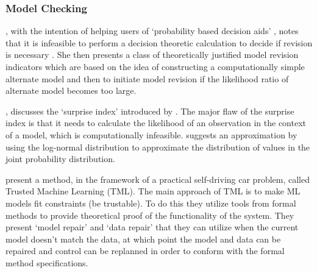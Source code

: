 \subsubsection{Model Checking}
    \citet{Laskey1991-mf}, with the intention of helping users of `probability based decision aids' , notes that it is infeasible to perform a decision theoretic calculation to decide if revision is necessary . She then presents a class of theoretically justified model revision indicators which are based on the idea of constructing a computationally simple alternate model and then to initiate model revision if the likelihood ratio of alternate model becomes too large. 

    \citet{Zagorecki2015-qy}, discusses the `surprise index' introduced by \citet{Habbema1976-xd}. 
    The major flaw of the surprise index is that it needs to calculate the likelihood of an observation in the context of a model, which is computationally infeasible. \citeauthor{Zagorecki2015-qy} suggests an approximation by using the log-normal distribution to approximate the distribution of values in the joint probability distribution. 

    \citet{Ghosh2016-dl} present a method, in the framework of a practical self-driving car problem, called Trusted Machine Learning (TML). The main approach of TML is to make ML models fit constraints (be trustable). 
    To do this they utilize tools from formal methods to provide theoretical proof of the functionality of the system. They present `model repair' and `data repair' that they can utilize when the current model doesn't match the data, at which point the model and data can be repaired and control can be replanned in order to conform with the formal method specifications. 

